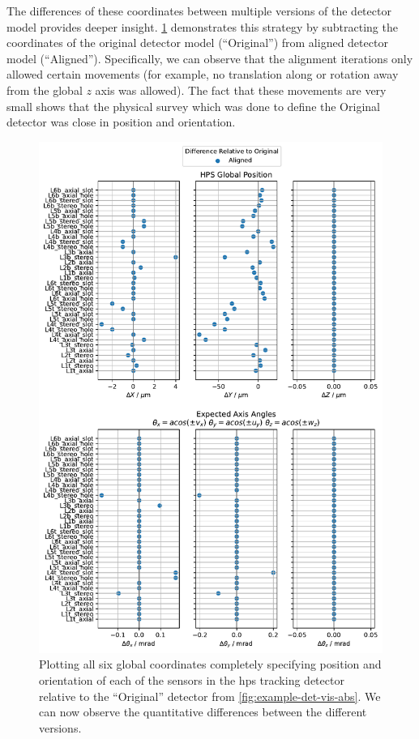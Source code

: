 The differences of these coordinates between multiple versions of the detector model
provides deeper insight.
\cref{fig:example-det-vis-diff} demonstrates this strategy by subtracting
the coordinates of the original detector model (``Original'') from aligned detector model (``Aligned'').
Specifically, we can observe that the alignment iterations only allowed certain movements
(for example, no translation along or rotation away from the global $z$ axis was allowed).
The fact that these movements are very small shows that the physical survey which was done
to define the Original detector was close in position and orientation.

\begin{figure}
  \centering
  \includegraphics[height=0.85\textheight]{figures/hps/alignment/example-det-vis-diff.pdf}
  \caption{Plotting all six global coordinates completely specifying position and
    orientation of each of the sensors in the \ac{hps} tracking detector relative to
    the ``Original'' detector from \cref{fig:example-det-vis-abs}. We can now observe
    the quantitative differences between the different versions.}
  \label{fig:example-det-vis-diff}
\end{figure}

